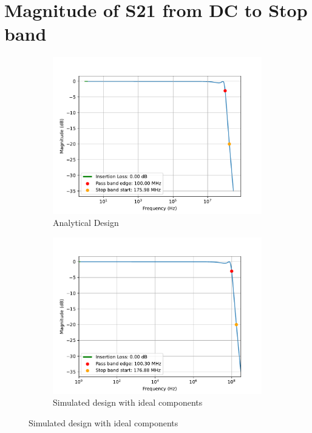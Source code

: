 \documentclass[letterpaper,12pt]{article}
\begin{document}
\section{Magnitude of S21 from DC to Stop band} \label{sec:s21_dcstop}
\begin{figure}[H]
    \begin{subfigure}[t]{.49\textwidth}
      \centering
      \includegraphics[width=\linewidth]{figures/6.analytical.pdf}
      \caption{Analytical Design}
    \end{subfigure}
    \hfill
    \begin{subfigure}[t]{.49\textwidth}
      \centering
      \includegraphics[width=\linewidth]{figures/6.ideal}
      \caption{Simulated design with ideal components}
    \end{subfigure}
  

\end{figure}
\end{document}
